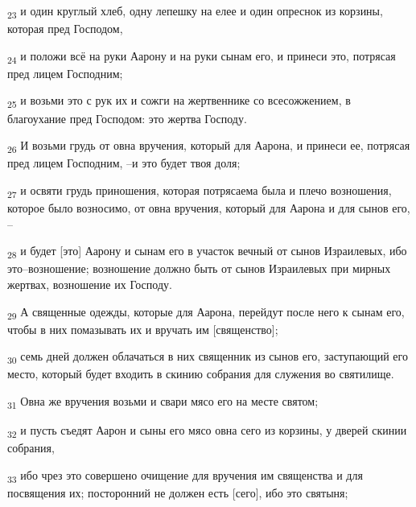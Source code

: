 \begin{tcolorbox}
\textsubscript{23} и один круглый хлеб, одну лепешку на елее и один опреснок из корзины, которая пред Господом,
\end{tcolorbox}
\begin{tcolorbox}
\textsubscript{24} и положи всё на руки Аарону и на руки сынам его, и принеси это, потрясая пред лицем Господним;
\end{tcolorbox}
\begin{tcolorbox}
\textsubscript{25} и возьми это с рук их и сожги на жертвеннике со всесожжением, в благоухание пред Господом: это жертва Господу.
\end{tcolorbox}
\begin{tcolorbox}
\textsubscript{26} И возьми грудь от овна вручения, который для Аарона, и принеси ее, потрясая пред лицем Господним, --и это будет твоя доля;
\end{tcolorbox}
\begin{tcolorbox}
\textsubscript{27} и освяти грудь приношения, которая потрясаема была и плечо возношения, которое было возносимо, от овна вручения, который для Аарона и для сынов его, --
\end{tcolorbox}
\begin{tcolorbox}
\textsubscript{28} и будет [это] Аарону и сынам его в участок вечный от сынов Израилевых, ибо это--возношение; возношение должно быть от сынов Израилевых при мирных жертвах, возношение их Господу.
\end{tcolorbox}
\begin{tcolorbox}
\textsubscript{29} А священные одежды, которые для Аарона, перейдут после него к сынам его, чтобы в них помазывать их и вручать им [священство];
\end{tcolorbox}
\begin{tcolorbox}
\textsubscript{30} семь дней должен облачаться в них священник из сынов его, заступающий его место, который будет входить в скинию собрания для служения во святилище.
\end{tcolorbox}
\begin{tcolorbox}
\textsubscript{31} Овна же вручения возьми и свари мясо его на месте святом;
\end{tcolorbox}
\begin{tcolorbox}
\textsubscript{32} и пусть съедят Аарон и сыны его мясо овна сего из корзины, у дверей скинии собрания,
\end{tcolorbox}
\begin{tcolorbox}
\textsubscript{33} ибо чрез это совершено очищение для вручения им священства и для посвящения их; посторонний не должен есть [сего], ибо это святыня;
\end{tcolorbox}
